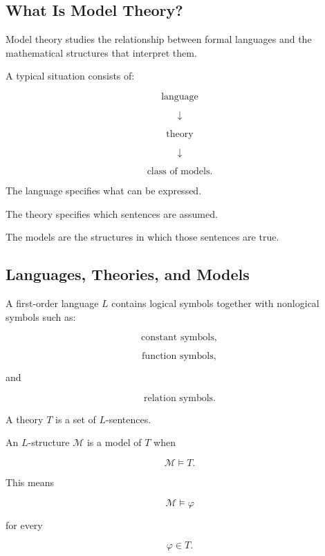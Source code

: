 \subsection{What Is Model Theory?}
\label{subsec:what-is-model-theory}

Model theory studies the relationship between formal languages and the
mathematical structures that interpret them.

A typical situation consists of:

\[
\boxed{
\text{language}
}
\]

\[
\downarrow
\]

\[
\boxed{
\text{theory}
}
\]

\[
\downarrow
\]

\[
\boxed{
\text{class of models}.
}
\]

The language specifies what can be expressed.

The theory specifies which sentences are assumed.

The models are the structures in which those sentences are true.

\subsection{Languages, Theories, and Models}
\label{subsec:languages-theories-models}

A first-order language \(L\) contains logical symbols together with
nonlogical symbols such as:

\[
\boxed{
\text{constant symbols},
}
\]

\[
\boxed{
\text{function symbols},
}
\]

and

\[
\boxed{
\text{relation symbols}.
}
\]

A theory \(T\) is a set of \(L\)-sentences.

An \(L\)-structure \(\mathcal{M}\) is a model of \(T\) when

\[
\boxed{
\mathcal{M}\models T.
}
\]

This means

\[
\mathcal{M}\models\varphi
\]

for every

\[
\varphi\in T.
\]

